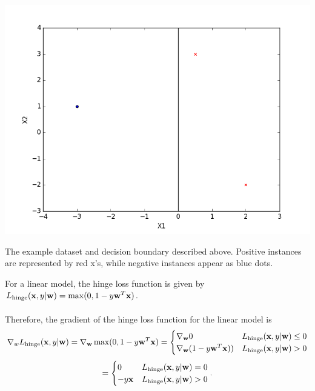 \begin{center}
  \includegraphics[width=.8\textwidth]{SimpleDatasetWithDecisionBoundary.png}
\end{center}
\begin{small}
  The example dataset and decision boundary described above. Positive instances are
  represented by red x's, while negative instances appear as blue dots.
\end{small}

For a linear model, the hinge loss function is given by $L_{\text{hinge}}(\mathbf{x}, y \vert \mathbf{w}) = \max(0, 1 - y \mathbf{w}^T \mathbf{x})$.\\
\\
Therefore, the gradient of the hinge loss function for the linear model is
\[ \nabla_{w}L_{\text{hinge}}(\mathbf{x}, y \vert \mathbf{w}) = \nabla_{\mathbf{w}} \max(0, 1 - y \mathbf{w}^T \mathbf{x}) =
\begin{cases} 
   \nabla_{\mathbf{w}} 0 & L_{\text{hinge}}(\mathbf{x}, y \vert \mathbf{w}) \leq 0 \\
   \nabla_{\mathbf{w}}(1 - y \mathbf{w}^T \mathbf{x})) & L_{\text{hinge}}(\mathbf{x}, y \vert \mathbf{w}) > 0
\end{cases} \]
\[ =
\begin{cases} 
   0 & L_{\text{hinge}}(\mathbf{x}, y \vert \mathbf{w}) = 0 \\
   - y \mathbf{x} & L_{\text{hinge}}(\mathbf{x}, y \vert \mathbf{w}) > 0
\end{cases}. \]

